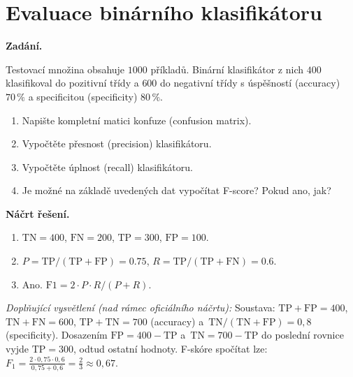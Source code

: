 \section{Evaluace binárního klasifikátoru}

\noindent\textbf{Zadání.}\par
Testovací množina obsahuje $1000$ příkladů. Binární klasifikátor z nich $400$ klasifikoval do pozitivní
třídy a $600$ do negativní třídy s úspěšností (accuracy) $70\,\%$ a specificitou (specificity) $80\,\%$.

\begin{enumerate}
  \item Napište kompletní matici konfuze (confusion matrix).
  \item Vypočtěte přesnost (precision) klasifikátoru.
  \item Vypočtěte úplnost (recall) klasifikátoru.
  \item Je možné na základě uvedených dat vypočítat F-score? Pokud ano, jak?
\end{enumerate}

\medskip
\noindent\textbf{Náčrt řešení.}\par
\begin{enumerate}
  \item $\mathrm{TN} = 400$, $\mathrm{FN} = 200$, $\mathrm{TP} = 300$, $\mathrm{FP} = 100$.
  \item $P = \mathrm{TP}/(\mathrm{TP}+\mathrm{FP}) = 0.75$, $R = \mathrm{TP}/(\mathrm{TP}+\mathrm{FN}) = 0.6$.
  \item Ano. $\mathrm{F1} = 2 \cdot P \cdot R / (P + R)$.
\end{enumerate}

\medskip
\noindent\textit{Doplňující vysvětlení (nad rámec oficiálního náčrtu):} Soustava: $\mathrm{TP}+\mathrm{FP}=400$, $\mathrm{TN}+\mathrm{FN}=600$, $\mathrm{TP}+\mathrm{TN}=700$ (accuracy) a~$\mathrm{TN}/(\mathrm{TN}+\mathrm{FP})=0{,}8$ (specificity). Dosazením $\mathrm{FP}=400-\mathrm{TP}$ a~$\mathrm{TN}=700-\mathrm{TP}$ do poslední rovnice vyjde $\mathrm{TP}=300$, odtud ostatní hodnoty. F-skóre spočítat lze: $F_1=\frac{2\cdot0{,}75\cdot0{,}6}{0{,}75+0{,}6}=\frac23\approx0{,}67$.
